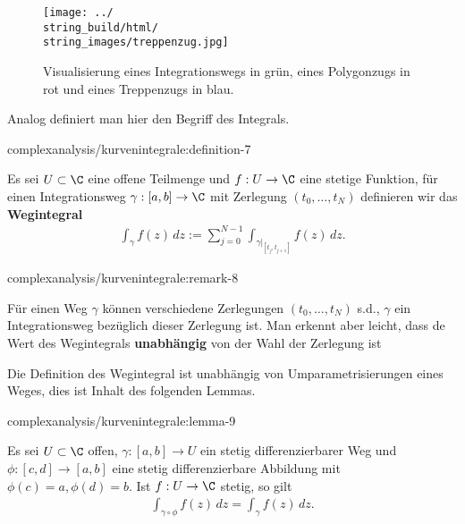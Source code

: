 \documentclass[letterpaper,10pt,german]{jupyterBook}
\begin{document}
\begin{figure}[htbp]
\centering


\noindent\texttt{[image: ../\\string\_build/html/\\string\_images/treppenzug.jpg]}
\caption{Visualisierung eines Integrationswegs in grün, eines Polygonzugs in rot und eines Treppenzugs in blau.}\label{\detokenize{complexanalysis/kurvenintegrale:fig-treppenzug}}\end{figure}

\par
Analog definiert man hier den Begriff des Integrals.
\begin{definition}{}{complexanalysis/kurvenintegrale:definition-7}



\par
Es sei \(U\subset\C\) eine offene Teilmenge und \(f:U\to\C\) eine stetige Funktion, für einen Integrationsweg \(\gamma:[a,b]\to\C\) mit Zerlegung \((t_0,\ldots,t_N)\)  definieren wir das \textbf{Wegintegral}
\begin{align*}
\int_\gamma f(z)\, dz:= \sum_{j=0}^{N-1} \int_{\gamma\rvert_{[t_j,t_{j+1}]}} f(z)\,dz.
\end{align*}\end{definition}
\begin{remark}{}{complexanalysis/kurvenintegrale:remark-8}



\par
Für einen Weg \(\gamma\) können verschiedene Zerlegungen \((t_0,\ldots,t_N)\) s.d., \(\gamma\) ein Integrationsweg bezüglich dieser Zerlegung ist. Man erkennt aber leicht, dass de Wert des Wegintegrals \textbf{unabhängig} von der Wahl der Zerlegung ist
\end{remark}

\par
Die Definition des Wegintegral ist unabhängig von Umparametrisierungen eines Weges, dies ist Inhalt des folgenden Lemmas.
\begin{lemma}{}{complexanalysis/kurvenintegrale:lemma-9}



\par
Es sei \(U\subset\C\) offen, \(\gamma:[a,b]\to U\) ein stetig differenzierbarer Weg und \(\phi:[c,d]\to[a,b]\) eine stetig differenzierbare Abbildung mit \(\phi(c)=a,\phi(d)=b\). Ist \(f:U\to\C\) stetig, so gilt
\begin{align*}
\int_{\gamma\circ\phi} f(z)\, dz = \int_\gamma f(z)\, dz.
\end{align*}\end{lemma}
\end{document}
